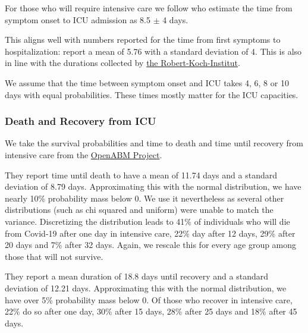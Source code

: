 For those who will require intensive care we follow \citet{Chen2020} who estimate the
time from symptom onset to ICU admission as 8.5 $\pm$ 4 days.

This aligns well with numbers reported for the time from first symptoms to
hospitalization: \citet{Gaythorpe2020} report a mean of 5.76 with a standard deviation
of 4. This is also in line with the durations collected by
\href{https://www.rki.de/DE/Content/InfAZ/N/Neuartiges_Coronavirus/Steckbrief.html#doc13776792bodyText16}{the
Robert-Koch-Institut}.

We assume that the time between symptom onset and ICU takes 4, 6, 8 or 10 days with
equal probabilities. These times mostly matter for the ICU capacities.


\subsubsection{Death and Recovery from ICU}

We take the survival probabilities and time to death and time until recovery from
intensive care from the \href{https://tinyurl.com/y5owhyts}{OpenABM Project}.

They report time until death to have a mean of 11.74 days and a standard deviation of
8.79 days. Approximating this with the normal distribution, we have nearly 10\%
probability mass below 0. We use it nevertheless as several other distributions (such as
chi squared and uniform) were unable to match the variance. Discretizing the
distribution leads to 41\% of individuals who will die from Covid-19 after one day in
intensive care, 22\% day after 12 days, 29\% after 20 days and 7\% after 32 days. Again,
we rescale this for every age group among those that will not survive.

They report a mean duration of 18.8 days until recovery and a standard deviation of
12.21 days. Approximating this with the normal distribution, we have over 5\%
probability mass below 0. Of those who recover in intensive care, 22\% do so
after one day, 30\% after 15 days, 28\% after 25 days and 18\% after 45 days.
